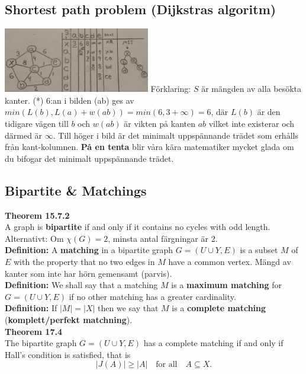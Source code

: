 \documentclass{article}
\begin{document}
\begin{multicols}{2}
\subsection{Shortest path problem (Dijkstras algoritm)}
\includegraphics[width=0.48\textwidth]{images/kortast}
Förklaring: $S$ är mängden av alla besökta kanter. (*) 6:an i bilden (ab) ges av $min(L(b),L(a)+w(ab))=min(6,3+\infty)=6$, där $L(b)$ är den tidigare vägen till $b$ och $w(ab)$ är vikten på kanten $ab$ vilket inte existerar och därmed är $\infty$. Till höger i bild är det minimalt uppspännande trädet som erhålls från kant-kolumnen. \textbf{På en tenta} blir våra kära matematiker mycket glada om du bifogar det minimalt uppspännande trädet.
    \subsection{Bipartite \& Matchings}
    
    
    \textbf{Theorem 15.7.2}\\
    A graph is \textbf{bipartite} if and only if it contains no cycles with odd length. Alternativt: Om $\chi(G) = 2$, minsta antal färgningar är 2.\\
    \newline
    \textbf{Definition:} A \textbf{matching} in a bipartite graph $G = (U \cup Y, E)$ is a subset $M$ of $E$ with the property that no two edges in $M$ have a common vertex. Mängd av kanter som inte har hörn gemensamt (parvis).\\
    \newline
    \textbf{Definition:} We shall say that a matching $M$ is a \textbf{maximum matching} for $G = (U \cup Y, E)$ if no other matching has a greater cardinality.\\
    \newline
    \textbf{Definition:} If $|M|=|X|$ then we say that $M$ is a \textbf{complete matching} (\textbf{komplett/perfekt matchning}). \\
    \newline
    \textbf{Theorem 17.4}\\
    The bipartite graph $G = (U \cup Y, E)$ has a complete matching if and only if Hall's condition is satisfied, that is 
    $$|J(A)| \geq |A| \quad \text{for all} \quad A \subseteq X.$$ 
\end{multicols}
\end{document}
